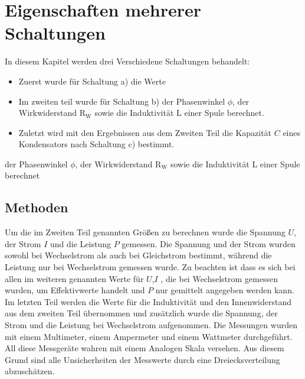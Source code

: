\section{Eigenschaften mehrerer Schaltungen}
In diesem Kapitel werden  drei Verschiedene Schaltungen behandelt:
\begin{itemize}
	\item Zuerst wurde für Schaltung a) die Werte %
	\item Im zweiten teil wurde für Schaltung b) der Phasenwinkel $\phi$, der Wirkwiderstand R$_\text{W}$ sowie die Induktivität L einer Spule	 berechnet.
	\item Zuletzt wird mit den Ergebnissen aus dem Zweiten Teil die Kapazität $C$ eines Kondensators nach Schaltung c) bestimmt.
\end{itemize}

der Phasenwinkel $\phi$, der Wirkwiderstand R$_\text{W}$ sowie die Induktivität L einer Spule berechnet

\subsection{Methoden}\label{kap:MethodenS}
Um die im Zweiten Teil genannten Größen zu berechnen wurde die Spannung $U$, der Strom $I$ und die Leistung $P$ gemessen. 
Die Spannung und der Strom wurden sowohl bei Wechselstrom als auch bei Gleichstrom bestimmt, während die Leistung nur bei Wechselstrom gemessen wurde. Zu beachten ist dass es sich bei allen im weiteren genannten Werte für $U$,$I$ , die bei Wechselstrom gemessen wurden, um Effektivwerte handelt und $P$ nur gemittelt angegeben werden kann.
Im letzten Teil werden die Werte für die Induktivität und den Innenwiderstand aus dem zweiten Teil übernommen und zusätzlich wurde die Spannung, der Strom und die Leistung bei Wechselstrom aufgenommen.
Die Messungen wurden mit einem Multimeter, einem Ampermeter und einem Wattmeter durchgeführt.
All diese Messgeräte wahren mit einem Analogen Skala versehen. Aus diesem Grund sind alle Unsicherheiten der Messwerte durch eine Dreiecksverteilung abzuschätzen. 
